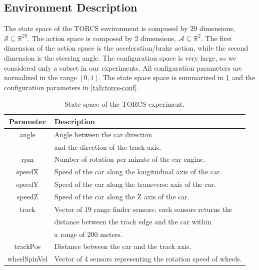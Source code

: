 \subsection{Environment Description}
The state space of the TORCS environment is composed by $29$ dimensions, $\mathcal{S} \subseteq \mathbb{R}^{29}$. The action space is composed by 2 dimensions, $\mathcal{A} \subseteq \mathbb{R}^2$. The first dimension of the action space is the acceleration/brake action, while the second dimension is the steering angle. The configuration space is very large, so we considered only a subset in our experiments.
All configuration parameters are normalized in the range $[0,1]$.
The state space space is summarized in \cref{tab:torcs-state} and the configuration parameters in \cref{tab:torcs-conf}. 
\begin{table}[tb]
\centering
\begin{tabular}{ c | l }
  \toprule			
  Parameter & Description \\
  \midrule
  angle & Angle between the car direction \\
  &  and the direction of the track axis. \\
  rpm & Number of rotation per minute of the car engine. \\
  speedX & Speed of the car along the longitudinal axis of the car. \\
  speedY & Speed of the car along the transverse axis of the car. \\
  speedZ & Speed of the car along the Z axis of the car.\\
  track & Vector of 19 range finder sensors: each sensors returns the \\
  & distance between the track edge and the car within \\
  & a range of 200 meters. \\
  trackPos & Distance between the car and the track axis. \\
  wheelSpinVel & Vector of 4 sensors representing the rotation speed of wheels. \\
\bottomrule
\end{tabular}
\caption{State space of the TORCS experiment.} \label{tab:torcs-state}
\end{table}
